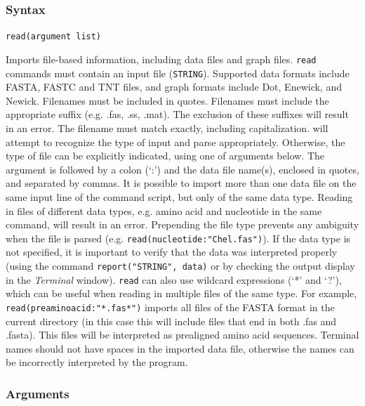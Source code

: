 	\subsubsection{Syntax}
		\texttt{read(argument list)}
			
	\begin{phygdescription}
		{Imports file-based information, including data files and graph files. \texttt{read} 
		commands must contain an input file (\texttt{STRING}). Supported data formats 
		include FASTA, FASTC and TNT files, and graph formats include Dot, Enewick, %
		and Newick. Filenames must be included in quotes. Filenames must include the 
		appropriate suffix (e.g. .fas, .ss, .mat). The exclusion of these suffixes will result 
		in an error. The filename must match exactly, including capitalization. \phyg will 
		attempt to recognize the type of input and parse appropriately. Otherwise, the 
		type of file can be explicitly indicated, using one of arguments below. The argument 
		is followed by a colon (`:') and the data file name(s), enclosed in quotes, and 
		separated by commas. It is possible to import more than one data file on the 
		same input line of the command script, but only of the same data type. Reading 
		in files of different data types, e.g. amino acid and nucleotide in the same command, will result in an 
		error. Prepending the file type prevents any ambiguity when the file is parsed
		(e.g. \texttt{read(nucleotide:"Chel.fas")}). If the data type is not specified, it is 
		important to verify that the data was interpreted properly (using the command 
		\texttt{report("STRING", data)} or by checking the output display in the 
		\textit{Terminal} window). \texttt{read} can also use wildcard expressions 
		(`*' and `?'), which can be useful when reading in multiple files of the 
		same type. For example, \texttt{read(preaminoacid:"*.fas*")} imports all files of the 
		FASTA format in the current directory (in this case this will include files that end 
		in both .fas and .fasta). This files will be interpreted as prealigned amino acid
		sequences. Terminal names should not have spaces in the imported 
		data file, otherwise the names can be incorrectly interpreted by the program.} 
	\end{phygdescription}

	\subsubsection{Arguments}
	
